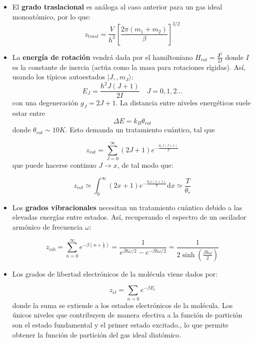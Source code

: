 \documentclass[12pt,a4paper]{article}
\numberwithin{equation}{section}
\numberwithin{figure}{section}
\newcommand{\parentesis}[1]{\left( #1  \right)}
\newcommand{\ccorchetes}[1]{\left[ #1  \right]}
\newcommand{\D}{\mathrm{d}}
\newcommand{\Jn}{\mathbf{J}}
\theoremstyle{definition}
\begin{document}
\begin{itemize}


\item El {\bf grado traslacional} es análoga al caso anterior para un gas ideal monoatómico, por lo que:
\begin{equation}
z_{trasl} = \frac{V}{h^3} \ccorchetes{\frac{2\pi(m_1+m_2)}{\beta}}^{3/2}
\end{equation}

\item La {\bf energía de rotación} vendrá dada por el hamiltoniano $H_{rot} = \frac{\Jn^2}{2I}$ donde $I$ es la constante de inercia (actúa como la masa para rotaciones rígidas). Así, usando los típicos autoestados $|J,,m_J\rangle$:
\begin{equation}
E_J = \frac{\hbar^2 J (J+1)}{2I} \quad J = 0,1,2\ldots
\end{equation} 
con una degeneración $g_J = 2J+1$. La distancia entre niveles energéticos suele estar entre \\

\begin{equation}
\Delta E = k_B \theta_{rot}
\end{equation}
donde $\theta_{rot} \sim 10 K$. Esto demanda un tratamiento cuántico, tal que

\begin{equation}
z_{rot} = \sum_{J=0}^{\infty} (2J+1) e^{- \frac{\theta_r J(J+1)}{T}}
\end{equation}
que puede hacerse continuo $J\rightarrow x$, de tal modo que:

\begin{equation}
z_{rot} \simeq \int_0^{\infty} (2x+1)e^{-\frac{\theta_r x(x+1)}{T}} \D x \simeq \frac{T}{\theta_r}
\end{equation}

\item Los {\bf grados vibracionales} necesitan un tratamiento cuántico debido a las elevadas energías entre estados. Así, recuperando el espectro de un oscilador armónico de frecuencia $\omega$:

\begin{equation}
z_{vib} = \sum_{n=0}^\infty e^{-\beta \parentesis{n+\frac{1}{2}}} = 
\frac{1}{e^{\beta \hbar \omega/2}-e^{-\beta \hbar \omega/2}} = \frac{1}{2\sinh \parentesis{\frac{\beta \hbar \omega}{2}}}
\end{equation}

\item Los grados de libertad electrónicos de la molécula viene dados por:

\begin{equation}
z_{el} = \sum_{n=0} e^{-\beta E_l}
\end{equation}
donde la suma se extiende a los estados electrónicos de la molécula. Los únicos niveles que contribuyen de manera efectiva a la función de partición son el estado fundamental y el primer estado excitado., lo que permite obtener la función de partición del gas ideal diatómico. 

\end{itemize}
\end{document}
